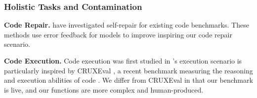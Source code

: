 
\subsubsection{Holistic Tasks and Contamination}



\noindent \textbf{Code Repair.} 
\citep{chen2023teaching, olausson2023demystifying, madaan2023self, peng2023check, zhang2023self} have investigated self-repair for existing code \llm{} benchmarks. These methods use error feedback for models to improve inspiring our code repair scenario.


\noindent \textbf{Code Execution.} 
Code execution was first studied in \citep{austin2021program, nye2021show}
\livecodebench{}'s execution scenario is particularly inspired by CRUXEval \citep{gu2024cruxeval}, a recent benchmark measuring the reasoning and execution abilities of code \llms{}. 
We differ from CRUXEval in that our benchmark is live, and our functions are more complex and human-produced.%


